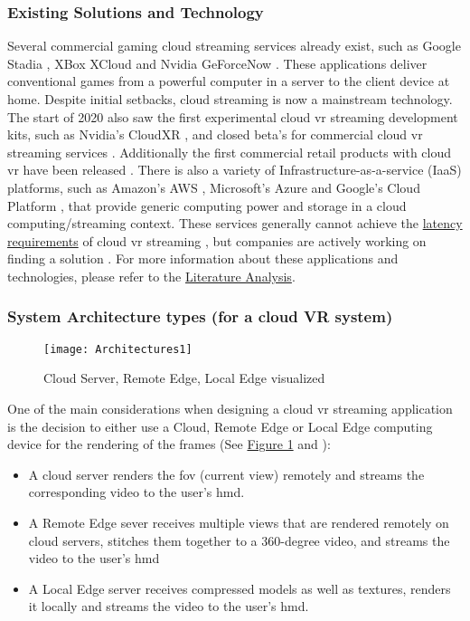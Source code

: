 \subsubsection{Existing Solutions and Technology}
Several commercial gaming cloud streaming services already exist, such as Google Stadia \parencite{stadia}, XBox XCloud \parencite{xcloud} and Nvidia GeForceNow \parencite{geforcenow}. These applications deliver conventional games from a powerful computer in a server to the client device at home. Despite initial setbacks, cloud streaming is now a mainstream technology. The start of 2020 also saw the first experimental cloud \acrshort{vr} streaming development kits, such as Nvidia's CloudXR \parencite{cloudxr}, and closed beta's for commercial cloud \acrshort{vr} streaming services \parencite{shadowvr}. Additionally the first commercial retail products with cloud \acrshort{vr} have been released \parencite{zerolight5g}. There is also a variety of Infrastructure\hyp{}as\hyp{}a\hyp{}service (IaaS) platforms, such as Amazon's AWS \parencite{aws}, Microsoft's Azure \parencite{azure} and Google's Cloud Platform \parencite{gcp}, that provide generic computing power and storage in a cloud computing/streaming context. These services generally cannot achieve the \hyperref[ssec:vrphy]{latency requirements} of cloud \acrshort{vr} streaming \parencite{survey_IRSS}, but companies are actively working on finding a solution \parencite{awswavelength}. For more information about these applications and technologies, please refer to the \hyperref[sec:lit]{Literature Analysis}.

\subsubsection{System Architecture types (for a cloud VR system)}
\begin{figure}[h]
\caption{Cloud Server, Remote Edge, Local Edge visualized \parencite{wlanvr}}
\label{fig:arch1}
\texttt{[image: Architectures1]}
\end{figure}

One of the main considerations when designing a cloud \acrshort{vr} streaming application is the decision to either use a Cloud, Remote Edge or Local Edge computing device for the rendering of the frames (See \hyperref[fig:arch1]{Figure 1} and \cite{wlanvr}):
\begin{itemize}
\item A cloud server renders the \acrfull{fov} (current view) remotely and streams the corresponding video to the user’s \acrfull{hmd}. 
\item A Remote Edge sever receives multiple views that are rendered remotely on cloud servers, stitches them together to a 360-degree video, and streams the video to the user’s \acrshort{hmd}
\item A Local Edge server receives compressed models as well as textures, renders it locally and streams the video to the user’s \acrshort{hmd}.
\end{itemize} 

